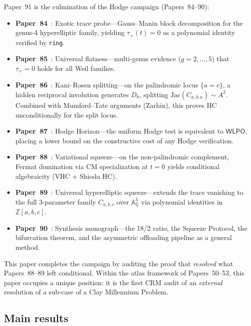 \documentclass[11pt]{article}
\theoremstyle{plain}
\theoremstyle{definition}
\theoremstyle{remark}
\newcommand{\ZZ}{\mathbb{Z}}
\newcommand{\QQ}{\mathbb{Q}}
\newcommand{\Aff}{\mathbb{A}}
\newcommand{\Jac}{\mathrm{Jac}}
\newcommand{\WLPO}{\mathsf{WLPO}}
\begin{document}
Paper~91 is the culmination of the Hodge campaign (Papers~84--90):
\begin{itemize}[nosep]
\item \textbf{Paper~84}~\cite{p84}: Exotic trace probe---Gauss--Manin
  block decomposition for the genus-4 hyperelliptic family, yielding
  $\tau_+(t) = 0$ as a polynomial identity verified by \texttt{ring}.
\item \textbf{Paper~85}~\cite{p85}: Universal flatness---multi-genus
  evidence ($g = 2, \ldots, 5$) that $\tau_+ = 0$ holds for all
  Weil families.
\item \textbf{Paper~86}~\cite{p86}: Kani--Rosen splitting---on the
  palindromic locus $\{a = c\}$, a hidden reciprocal involution
  generates $D_8$, splitting $\Jac(C_{a,b,a}) \sim A^2$.  Combined
  with Mumford--Tate arguments (Zarhin), this proves HC unconditionally
  for the split locus.
\item \textbf{Paper~87}~\cite{p87}: Hodge Horizon---the uniform Hodge
  test is equivalent to $\WLPO$, placing a lower bound on the
  constructive cost of any Hodge verification.
\item \textbf{Paper~88}~\cite{p88}: Variational squeeze---on the
  non-palindromic complement, Fermat domination via CM specialization
  at $t = 0$ yields conditional algebraicity (VHC + Shioda HC).
\item \textbf{Paper~89}~\cite{p89}: Universal hyperelliptic squeeze---extends
  the trace vanishing to the full 3-parameter family $C_{a,b,c}$ over
  $\Aff^3_\QQ$ via polynomial identities in $\ZZ[a,b,c]$.
\item \textbf{Paper~90}~\cite{p90}: Synthesis monograph---the 18/2
  ratio, the Squeeze Protocol, the bifurcation theorem, and the
  asymmetric offloading pipeline as a general method.
\end{itemize}

This paper completes the campaign by auditing the proof that
\emph{resolved} what Papers~88--89 left conditional.  Within the
atlas framework of Papers~50--53, this paper occupies a unique
position: it is the first CRM audit of an \emph{external} resolution
of a sub-case of a Clay Millennium Problem.

\subsection{Main results}
\end{document}

